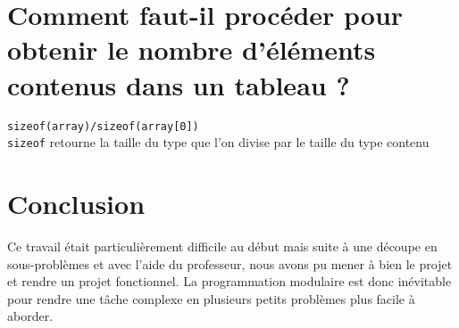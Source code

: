 \section{Comment faut-il procéder pour obtenir le nombre d'éléments contenus dans un tableau ?}
\texttt{sizeof(array)/sizeof(array[0])}\\ \texttt{sizeof} retourne la taille du type que l'on divise par le taille du type contenu

\section{Conclusion}
Ce travail était particulièrement difficile au début mais suite à une découpe en sous-problèmes et avec l'aide du professeur, nous avons pu mener à bien le projet et rendre un projet fonctionnel. La programmation modulaire est donc inévitable pour rendre une tâche complexe en plusieurs petits problèmes plus facile à aborder.

